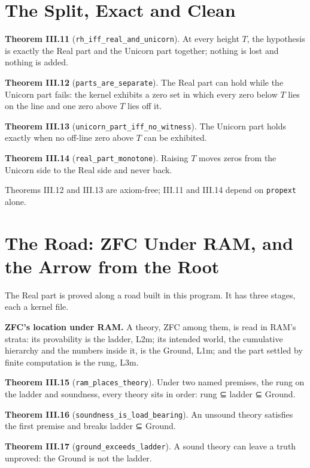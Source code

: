 \documentclass[10pt,twocolumn]{article}
\begin{document}
\hypertarget{the-split-exact-and-clean}{%
\section{The Split, Exact and Clean}\label{the-split-exact-and-clean}}

\textbf{Theorem III.11} (\texttt{rh\_iff\_real\_and\_unicorn}). At every
height \(T\), the hypothesis is exactly the Real part and the Unicorn
part together; nothing is lost and nothing is added.

\textbf{Theorem III.12} (\texttt{parts\_are\_separate}). The Real part
can hold while the Unicorn part fails: the kernel exhibits a zero set in
which every zero below \(T\) lies on the line and one zero above \(T\)
lies off it.

\textbf{Theorem III.13} (\texttt{unicorn\_part\_iff\_no\_witness}). The
Unicorn part holds exactly when no off-line zero above \(T\) can be
exhibited.

\textbf{Theorem III.14} (\texttt{real\_part\_monotone}). Raising \(T\)
moves zeros from the Unicorn side to the Real side and never back.

Theorems III.12 and III.13 are axiom-free; III.11 and III.14 depend on
\texttt{propext} alone.

\hypertarget{the-road-zfc-under-ram-and-the-arrow-from-the-root}{%
\section{The Road: ZFC Under RAM, and the Arrow from the
Root}\label{the-road-zfc-under-ram-and-the-arrow-from-the-root}}

The Real part is proved along a road built in this program. It has three
stages, each a kernel file.

\textbf{ZFC's location under RAM.} A theory, ZFC among them, is read in
RAM's strata: its provability is the ladder, L2m; its intended world,
the cumulative hierarchy and the numbers inside it, is the Ground, L1m;
and the part settled by finite computation is the rung, L3m.

\textbf{Theorem III.15} (\texttt{ram\_places\_theory}). Under two named
premises, the rung on the ladder and soundness, every theory sits in
order: rung ⊆ ladder ⊆ Ground.

\textbf{Theorem III.16} (\texttt{soundness\_is\_load\_bearing}). An
unsound theory satisfies the first premise and breaks ladder ⊆ Ground.

\textbf{Theorem III.17} (\texttt{ground\_exceeds\_ladder}). A sound
theory can leave a truth unproved: the Ground is not the ladder.
\end{document}
